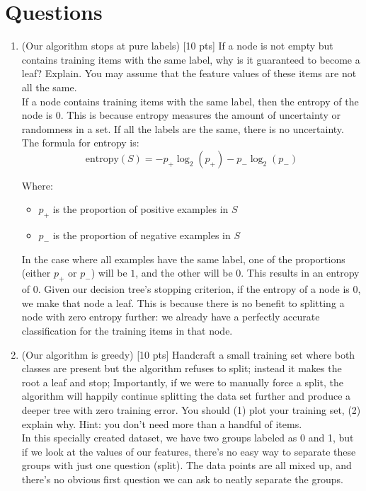\documentclass[a4paper]{article}
\theoremstyle{definition}
\begin{document}
\section{Questions}
\begin{enumerate}
\item (Our algorithm stops at pure labels) [10 pts] If a node is not empty but contains training items with the same label, why is it guaranteed to become a leaf?  Explain. You may assume that the feature values of these items are not all the same. \\

If a node contains training items with the same label, then the entropy of the node is \(0\). This is because entropy measures the amount of uncertainty or randomness in a set. If all the labels are the same, there is no uncertainty. The formula for entropy is:
\[ \text{entropy}(S) = -p_+ \log_2(p_+) - p_- \log_2(p_-) \]

Where:

\begin{itemize}
    \item \( p_+ \) is the proportion of positive examples in \( S \)
    \item \( p_- \) is the proportion of negative examples in \( S \)
\end{itemize}

In the case where all examples have the same label, one of the proportions (either \( p_+ \) or \( p_- \)) will be \(1\), and the other will be \(0\). This results in an entropy of \(0\).
Given our decision tree's stopping criterion, if the entropy of a node is \(0\), we make that node a leaf. This is because there is no benefit to splitting a node with zero entropy further: we already have a perfectly accurate classification for the training items in that node.

\item (Our algorithm is greedy)  [10 pts] Handcraft a small training set where both classes are present but the algorithm refuses to split; instead it makes the root a leaf and stop;
Importantly, if we were to manually force a split, the algorithm will happily continue splitting the data set further and produce a deeper tree with zero training error.
You should (1) plot your training set, (2) explain why.  Hint: you don't need more than a handful of items. \\

In this specially created dataset, we have two groups labeled as 0 and 1, but if we look at the values of our features, there's no easy way to separate these groups with just one question (split). The data points are all mixed up, and there's no obvious first question we can ask to neatly separate the groups.\\


\end{enumerate}
\end{document}
